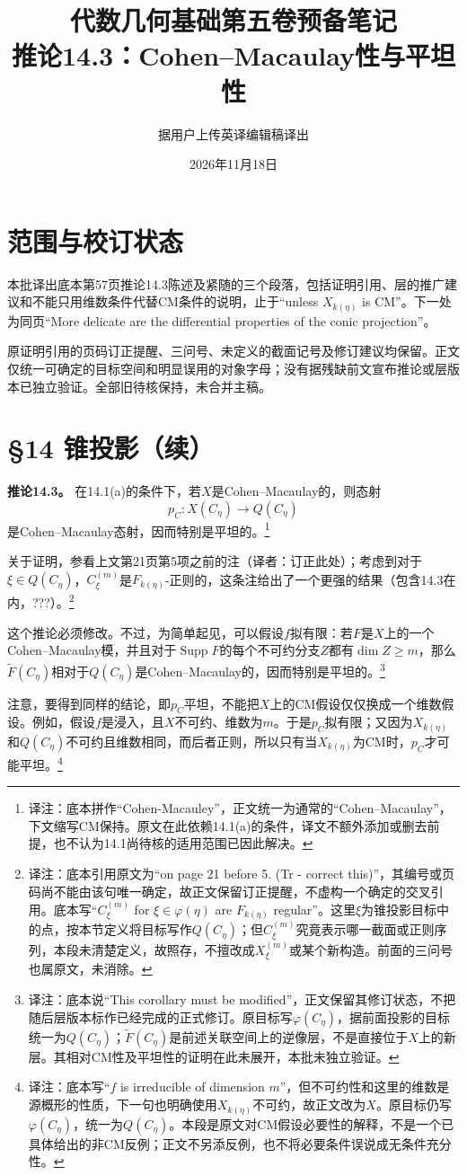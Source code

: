 \documentclass[openany,fontset=fandol]{ctexbook}
\newcommand{\note}[1]{\footnote{译注：#1}}
\begin{document}
\title{代数几何基础第五卷预备笔记\\推论14.3：Cohen--Macaulay性与平坦性}
\author{据用户上传英译编辑稿译出}
\date{2026年11月18日}
\maketitle
\chapter*{范围与校订状态}
本批译出底本第57页推论14.3陈述及紧随的三个段落，包括证明引用、层的推广建议和不能只用维数条件代替CM条件的说明，止于“unless $X_{k(\eta)}$ is CM”。下一处为同页“More delicate are the differential properties of the conic projection”。

原证明引用的页码订正提醒、三问号、未定义的截面记号及修订建议均保留。正文仅统一可确定的目标空间和明显误用的对象字母；没有据残缺前文宣布推论或层版本已独立验证。全部旧待核保持，未合并主稿。
\chapter*{§14 锥投影（续）}
\noindent\textbf{推论14.3。}
在14.1(a)的条件下，若$X$是Cohen--Macaulay的，则态射
\[
p_C:X(C_\eta)\longrightarrow Q(C_\eta)
\]
是Cohen--Macaulay态射，因而特别是平坦的。\note{底本拼作“Cohen-Macauley”，正文统一为通常的“Cohen--Macaulay”，下文缩写CM保持。原文在此依赖14.1(a)的条件，译文不额外添加或删去前提，也不认为14.1尚待核的适用范围已因此解决。}

关于证明，参看上文第21页第5项之前的注（译者：订正此处）；考虑到对于$\xi\in Q(C_\eta)$，$C^{(m)}_\xi$是$F_{k(\eta)}$-正则的，这条注给出了一个更强的结果（包含14.3在内，???）。\note{底本引用原文为“on page 21 before 5. (Tr - correct this)”，其编号或页码尚不能由该句唯一确定，故正文保留订正提醒，不虚构一个确定的交叉引用。底本写“$C^{(m)}_\xi$ for $\xi\in\varphi(\eta)$ are $F_{k(\eta)}$ regular”。这里$\xi$为锥投影目标中的点，按本节定义将目标写作$Q(C_\eta)$；但$C^{(m)}_\xi$究竟表示哪一截面或正则序列，本段未清楚定义，故照存，不擅改成$X^{(m)}_\xi$或某个新构造。前面的三问号也属原文，未消除。}

这个推论必须修改。不过，为简单起见，可以假设$f$拟有限：若$F$是$X$上的一个Cohen--Macaulay模，并且对于$\operatorname{Supp}F$的每个不可约分支$Z$都有$\dim Z\geq m$，那么$\widetilde F(C_\eta)$相对于$Q(C_\eta)$是Cohen--Macaulay的，因而特别是平坦的。\note{底本说“This corollary must be modified”，正文保留其修订状态，不把随后层版本标作已经完成的正式修订。原目标写$\varphi(C_\eta)$，据前面投影的目标统一为$Q(C_\eta)$；$\widetilde F(C_\eta)$是前述关联空间上的逆像层，不是直接位于$X$上的新层。其相对CM性及平坦性的证明在此未展开，本批未独立验证。}

\newpage
注意，要得到同样的结论，即$p_C$平坦，不能把$X$上的CM假设仅仅换成一个维数假设。例如，假设$f$是浸入，且$X$不可约、维数为$m$。于是$p_C$拟有限；又因为$X_{k(\eta)}$和$Q(C_\eta)$不可约且维数相同，而后者正则，所以只有当$X_{k(\eta)}$为CM时，$p_C$才可能平坦。\note{底本写“$f$ is irreducible of dimension $m$”，但不可约性和这里的维数是源概形的性质，下一句也明确使用$X_{k(\eta)}$不可约，故正文改为$X$。原目标仍写$\varphi(C_\eta)$，统一为$Q(C_\eta)$。本段是原文对CM假设必要性的解释，不是一个已具体给出的非CM反例；正文不另添反例，也不将必要条件误说成无条件充分性。}
\end{document}
